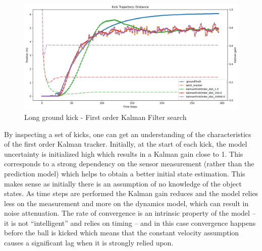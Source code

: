 \documentclass[a4paper,twoside,12pt]{report}
\begin{document}
\begin{figure}[h!]
\begin{center}
\includegraphics[width=12cm]{images/fok_ground_long.png}
\caption{Long ground kick - First order Kalman Filter search}
\label{fig:fokgroundlong}
\end{center}
\end{figure}



By inspecting a set of kicks, one can get an understanding of the characteristics of the first order Kalman tracker. Initially, at the start of each kick, the model uncertainty is initialized high which results in a Kalman gain close to 1. This corresponds to a strong dependency on the sensor measurement (rather than the prediction model) which helps to obtain a better initial state estimation. This makes sense as initially there is an assumption of no knowledge of the object states. As time steps are performed the Kalman gain reduces and the model relies less on the measurement and more on the dynamics model, which can result in noise attenuation. The rate of convergence is an intrinsic property of the model -- it is not ``intelligent'' and relies on timing -- and in this case convergence happens before the ball is kicked which means that the constant velocity assumption causes a significant lag when it is strongly relied upon.
\end{document}
